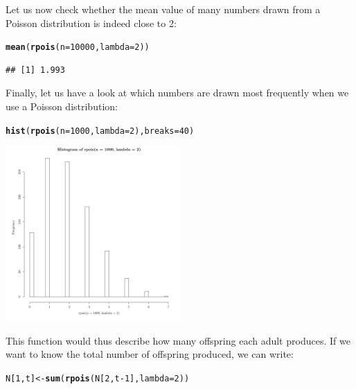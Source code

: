 \documentclass{article}\usepackage[]{graphicx}\usepackage[]{color}
\makeatletter
\newcommand{\hlnum}[1]{\textcolor[rgb]{0.686,0.059,0.569}{#1}}%
\newcommand{\hlopt}[1]{\textcolor[rgb]{0,0,0}{#1}}%
\newcommand{\hlstd}[1]{\textcolor[rgb]{0.345,0.345,0.345}{#1}}%
\newcommand{\hlkwb}[1]{\textcolor[rgb]{0.69,0.353,0.396}{#1}}%
\newcommand{\hlkwc}[1]{\textcolor[rgb]{0.333,0.667,0.333}{#1}}%
\newcommand{\hlkwd}[1]{\textcolor[rgb]{0.737,0.353,0.396}{\textbf{#1}}}%
\newenvironment{kframe}{%
 \def\at@end@of@kframe{}%
 \ifinner\ifhmode%
  \def\at@end@of@kframe{\end{minipage}}%
  \begin{minipage}{\columnwidth}%
 \fi\fi%
 \def\FrameCommand##1{\hskip\@totalleftmargin \hskip-\fboxsep
 \colorbox{shadecolor}{##1}\hskip-\fboxsep
     \hskip-\linewidth \hskip-\@totalleftmargin \hskip\columnwidth}%
 \MakeFramed {\advance\hsize-\width
   \@totalleftmargin\z@ \linewidth\hsize
   \@setminipage}}%
 {\par\unskip\endMakeFramed%
 \at@end@of@kframe}
\newenvironment{knitrout}{}{} %
\makeatother
\begin{document}
Let us now check whether the mean value of many numbers drawn from a Poisson distribution is indeed close to 2:
\begin{knitrout}
\color{fgcolor}\begin{kframe}
\begin{alltt}
\hlkwd{mean}\hlstd{(}\hlkwd{rpois}\hlstd{(}\hlkwc{n}\hlstd{=}\hlnum{10000}\hlstd{,}\hlkwc{lambda}\hlstd{=}\hlnum{2}\hlstd{))}
\end{alltt}
\begin{verbatim}
## [1] 1.993
\end{verbatim}
\end{kframe}
\end{knitrout}
Finally, let us have a look at which numbers are drawn most frequently when we use a Poisson distribution:
\begin{knitrout}
\color{fgcolor}\begin{kframe}
\begin{alltt}
\hlkwd{hist}\hlstd{(}\hlkwd{rpois}\hlstd{(}\hlkwc{n}\hlstd{=}\hlnum{1000}\hlstd{,}\hlkwc{lambda}\hlstd{=}\hlnum{2}\hlstd{),}\hlkwc{breaks}\hlstd{=}\hlnum{40}\hlstd{)}
\end{alltt}
\end{kframe}

{\centering \includegraphics[width=0.5\textwidth]{figure/dice7-1} 

}



\end{knitrout}
This function would thus describe how many offspring each adult produces. If we want to know the total number of offspring produced, we can write:
\begin{knitrout}
\color{fgcolor}\begin{kframe}
\begin{alltt}
\hlstd{N[}\hlnum{1}\hlstd{,t]}\hlkwb{<-}\hlkwd{sum}\hlstd{(}\hlkwd{rpois}\hlstd{(N[}\hlnum{2}\hlstd{,t}\hlopt{-}\hlnum{1}\hlstd{],}\hlkwc{lambda}\hlstd{=}\hlnum{2}\hlstd{))}
\end{alltt}
\end{kframe}
\end{knitrout}
\end{document}
